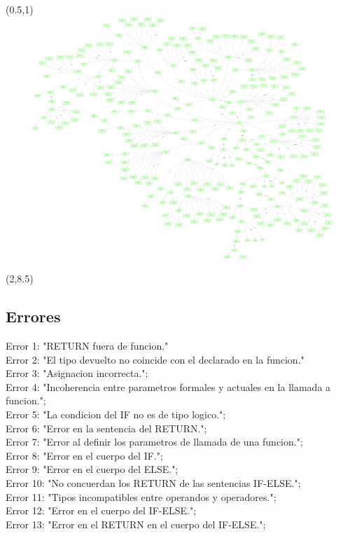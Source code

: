 \newpage
\mbox{}
\begin{textblock}{1}(0.5,1)
\centering
\includegraphics[width=20cm]{Enrico.pdf}
\end{textblock}
\begin{textblock}{14}(2,8.5)
\subsection{Errores}

\noindent Error 1: "RETURN fuera de funcion."\\
\noindent Error 2: "El tipo devuelto no coincide con el declarado en la funcion."\\
\noindent Error 3: "Asignacion incorrecta.";\\
\noindent Error 4: "Incoherencia entre parametros formales y actuales en la llamada a funcion.";\\
\noindent Error 5: "La condicion del IF no es de tipo logico.";\\
\noindent Error 6: "Error en la sentencia del RETURN.";\\
\noindent Error 7: "Error al definir los parametros de llamada de una funcion.";\\
\noindent Error 8: "Error en el cuerpo del IF.";\\
\noindent Error 9: "Error en el cuerpo del ELSE.";\\
\noindent Error 10: "No concuerdan los RETURN de las sentencias IF-ELSE.";\\
\noindent Error 11: "Tipos incompatibles entre operandos y operadores.";\\
\noindent Error 12: "Error en el cuerpo del IF-ELSE.";\\
\noindent Error 13: "Error en el RETURN en el cuerpo del IF-ELSE.";\\
\end{textblock}
